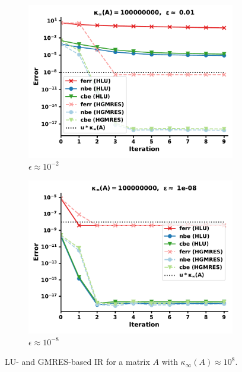 \begin{figure}[h]
\centering
\begin{subfigure}{.5\textwidth}
  \centering
  \includegraphics[width=\linewidth]{chapters/5_experiments/figures/LR512e3_0.pdf}
  \caption{$\epsilon \approx 10^{-2}$}
  \label{fig:lrir4_1}
\end{subfigure}%
\begin{subfigure}{.5\textwidth}
  \centering
  \includegraphics[width=\linewidth]{chapters/5_experiments/figures/LR512e3_1.pdf}
  \caption{$\epsilon \approx 10^{-8}$}
  \label{fig:lrir4_2}
\end{subfigure}
\caption[Low-Rank IR 4]{LU- and GMRES-based IR for a matrix $A$ with $\kappa_\infty(A) \approx 10^8$.}
\label{fig:lrir4}
\end{figure}

